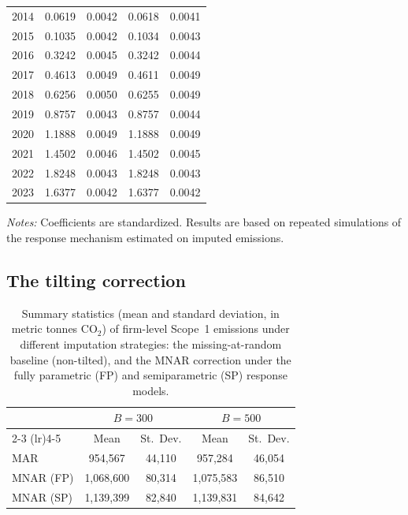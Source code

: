\documentclass[a4paper,12pt]{article}
\begin{document}
\begin{table}[htbp]
\begin{tabular}{lcccc}
2014 & 0.0619 & 0.0042 & 0.0618 & 0.0041 \\
2015 & 0.1035 & 0.0042 & 0.1034 & 0.0043 \\
2016 & 0.3242 & 0.0045 & 0.3242 & 0.0044 \\
2017 & 0.4613 & 0.0049 & 0.4611 & 0.0049 \\
2018 & 0.6256 & 0.0050 & 0.6255 & 0.0049 \\
2019 & 0.8757 & 0.0043 & 0.8757 & 0.0044 \\
2020 & 1.1888 & 0.0049 & 1.1888 & 0.0049 \\
2021 & 1.4502 & 0.0046 & 1.4502 & 0.0045 \\
2022 & 1.8248 & 0.0043 & 1.8248 & 0.0043 \\
2023 & 1.6377 & 0.0042 & 1.6377 & 0.0042 \\
\bottomrule
\end{tabular}

\begin{flushleft}
\footnotesize
\textit{Notes:} Coefficients are standardized. Results are based on repeated simulations of the response mechanism estimated on imputed emissions.
\end{flushleft}
\end{table}

\clearpage

\subsection{The tilting correction}


\begin{table}[htbp]
\small
\centering
\caption{Summary statistics (mean and standard deviation, in metric tonnes CO$_2$) of firm-level Scope~1 emissions under different imputation strategies: the missing-at-random baseline (non-tilted), and the MNAR correction under the fully parametric (FP) and semiparametric (SP) response models.}
\label{tab:emissions_tilts}
\begin{tabular}{lcccc}
\toprule
 & \multicolumn{2}{c}{$B=300$} & \multicolumn{2}{c}{$B=500$} \\
\cmidrule(lr){2-3} \cmidrule(lr){4-5}
 & Mean & St.\ Dev. & Mean & St.\ Dev. \\
\midrule
MAR        & 954,567  & 44,110  & 957,284 & 46,054  \\
MNAR (FP)  & 1,068,600 & 80,314 & 1,075,583  & 86,510 \\
MNAR (SP)  & 1,139,399 & 82,840 & 1,139,831 & 84,642 \\
\bottomrule
\end{tabular}
\end{table}
\end{document}
